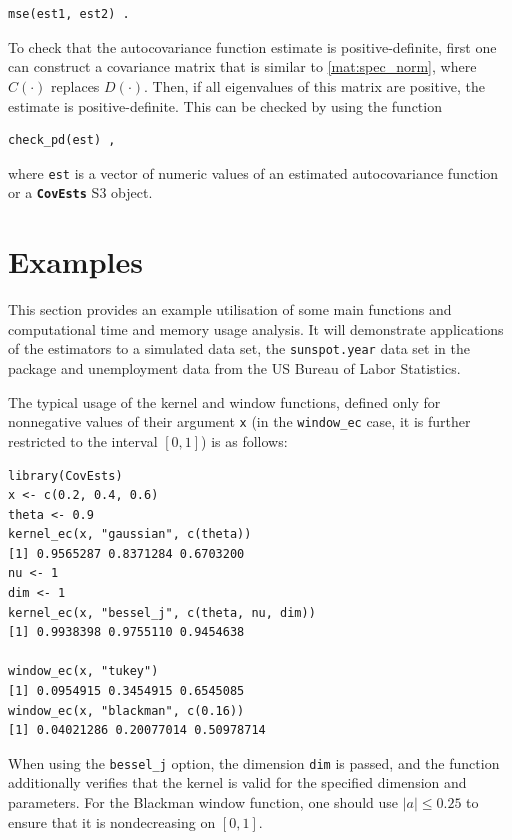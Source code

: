 \begin{verbatim}
mse(est1, est2) .
\end{verbatim}

To check that the autocovariance function estimate is positive-definite,
first one can construct a covariance matrix that is similar to
\eqref{mat:spec_norm}, where \(\widehat{C}(\cdot)\) replaces
\(D(\cdot).\) Then, if all eigenvalues of this matrix are positive, the
estimate is positive-definite. This can be checked by using the function

\begin{verbatim}
check_pd(est) ,
\end{verbatim}

where \texttt{est} is a vector of numeric values of an estimated
autocovariance function or a \textbf{\texttt{CovEsts}} S3 object.

\section{Examples}\label{sec:examples}

This section provides an example utilisation of some main functions and
computational time and memory usage analysis. It will demonstrate
applications of the estimators to a simulated data set, the
\texttt{sunspot.year} data set in the  package and
unemployment data from the US Bureau of Labor Statistics.

The typical usage of the kernel and window functions, defined only for
nonnegative values of their argument \texttt{x} (in the
\texttt{window\_ec} case, it is further restricted to the interval
\([0, 1]\)) is as follows:

\begin{verbatim}
library(CovEsts)
x <- c(0.2, 0.4, 0.6)
theta <- 0.9
kernel_ec(x, "gaussian", c(theta))
[1] 0.9565287 0.8371284 0.6703200
nu <- 1
dim <- 1
kernel_ec(x, "bessel_j", c(theta, nu, dim))
[1] 0.9938398 0.9755110 0.9454638

window_ec(x, "tukey")
[1] 0.0954915 0.3454915 0.6545085
window_ec(x, "blackman", c(0.16))
[1] 0.04021286 0.20077014 0.50978714
\end{verbatim}

When using the \texttt{bessel\_j} option, the dimension \texttt{dim} is
passed, and the function additionally verifies that the kernel is valid
for the specified dimension and parameters. For the Blackman window
function, one should use \(\left| a \right| \leq 0.25\) to ensure that
it is nondecreasing on \([0, 1].\)

